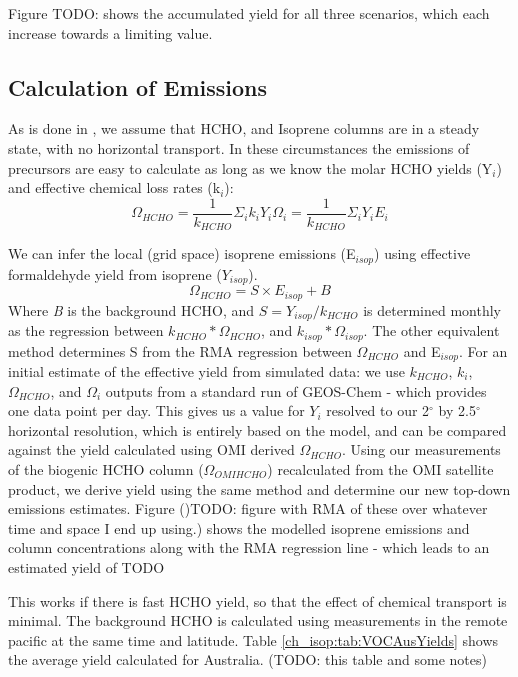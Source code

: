     Figure TODO: shows the accumulated yield for all three scenarios, which each increase towards a limiting value.
    
  \subsection{Calculation of Emissions}
    \label{ch_isop:sec:EmissionCalculation}
    As is done in \citet{Palmer2003, Millet2006, Bauwens2016}, we assume that HCHO, and Isoprene columns are in a steady state, with no horizontal transport.
    In these circumstances the emissions of precursors are easy to calculate as long as we know the molar HCHO yields (Y$_i$) and effective chemical loss rates (k$_i$):
    \begin{equation}
      \Omega_{HCHO} = \frac{1}{k_{HCHO}}\Sigma_i k_i Y_i \Omega_i = \frac{1}{k_{HCHO}}\Sigma_i Y_i E_i
    \end{equation}
    
    We can infer the local (grid space) isoprene emissions (E$_{isop}$) using effective formaldehyde yield from isoprene ($Y_{isop}$).
    \begin{equation} \label{ch_isop:eqn:isop_yield}
      \Omega_{HCHO} = S \times E_{isop} + B
    \end{equation}
    Where \textit{B} is the background HCHO, and $S = Y_{isop}/k_{HCHO}$ is determined monthly as the regression between $k_{HCHO}*\Omega_{HCHO}$, and $k_{isop}*\Omega_{isop}$.
    The other equivalent method determines S from the RMA regression between $\Omega_{HCHO}$ and E$_{isop}$.
    For an initial estimate of the effective yield from simulated data: we use $k_{HCHO}$, $k_{i}$, $\Omega_{HCHO}$, and $\Omega_i$ outputs from a standard run of GEOS-Chem - which provides one data point per day.
    This gives us a value for $Y_i$ resolved to our 2$^{\circ}$ by 2.5$^{\circ}$ horizontal resolution, which is entirely based on the model, and can be compared against the yield calculated using OMI derived $\Omega_{HCHO}$.
    Using our measurements of the biogenic HCHO column ($\Omega_{OMIHCHO}$) recalculated from the OMI satellite product, we derive yield using the same method and determine our new top-down emissions estimates.
    Figure ()TODO: figure with RMA of these over whatever time and space I end up using.) shows the modelled isoprene emissions and column concentrations along with the RMA regression line - which leads to an estimated yield of TODO
    
    This works if there is fast HCHO yield, so that the effect of chemical transport is minimal.
    The background HCHO is calculated using measurements in the remote pacific at the same time and latitude.
    Table \ref{ch_isop:tab:VOCAusYields} shows the average yield calculated for Australia. (TODO: this table and some notes)
    
